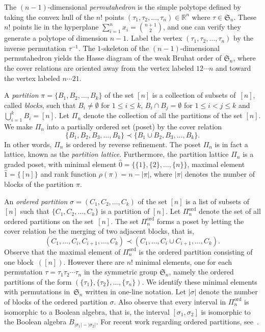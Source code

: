 \documentclass[ALCO,ThmDefs,Unicode,epreuves]{cedram}
\newcommand{\Rrr}{\mathbb{R}}
\newcommand{\Sym}{\mathfrak{S}}
\DeclareMathOperator{\ord}{ord}
\newcommand{\hz}{\hat{0}}
\newcommand{\ho}{\hat{1}}
\newcommand{\coveredby}{\prec}
\newcommand{\Qn}{\Pi^{\ord}_{n}}
\begin{document}
The $(n-1)$-dimensional
\emph{permutahedron} 
is the simple polytope defined by
taking the convex hull of the $n!$ points 
$(\tau_{1}, \tau_{2}, \ldots, \tau_{n}) \in \Rrr^{n}$
where $\tau \in \Sym_{n}$.
These $n!$ points lie in the hyperplane
$\sum_{i=1}^{n} x_{i} = \binom{n+1}{2}$,
and one can verify
they generate a
polytope of dimension $n-1$.
Label the vertex
$(\tau_{1}, \tau_{2}, \ldots, \tau_{n})$ by the inverse permutation $\tau^{-1}$.
The $1$-skeleton of the $(n-1)$-dimensional permutahedron
yields the Hasse diagram of the weak Bruhat order of $\Sym_{n}$,
where the cover relations are oriented away from
the vertex labeled $12 \cdots n$ and toward the vertex labeled $n \cdots 21$.




A \emph{partition} $\pi = \{B_{1}, B_{2}, \ldots, B_{k}\}$
of the set $[n]$ is a collection of subsets of~$[n]$, called \emph{blocks},
such that $B_{i} \neq \emptyset$ for $1 \leq i \leq k$,
$B_{i} \cap B_{j} = \emptyset$ for $1 \leq i < j \leq k$
and
$\bigcup_{i=1}^{k} B_{i} = [n]$.
Let $\Pi_{n}$ denote
the collection of all the partitions of the set $[n]$.
We make $\Pi_{n}$ into a partially ordered set (poset)
by the cover relation
$$
  \{B_{1}, B_{2}, B_{3}, \ldots, B_{k}\}
  \coveredby
  \{B_{1} \cup B_{2}, B_{3}, \ldots, B_{k}\} .
$$
In other words, $\Pi_{n}$ is ordered by reverse refinement.
The poset $\Pi_{n}$ is in fact a lattice,
known as the \emph{partition lattice}.
Furthermore, the partition lattice $\Pi_{n}$ is a graded poset,
with minimal element
$\hz = \{\{1\}, \{2\}, \ldots, \{n\}\}$,
maximal element
$\ho = \{[n]\}$
and rank function
$\rho(\pi) = n-|\pi|$,
where
$|\pi|$ denotes the number of blocks of the partition $\pi$.



An \emph{ordered partition} 
$\sigma = (C_{1}, C_{2}, \ldots, C_{k})$
of the set $[n]$
is a list of subsets of $[n]$ such that
$\{C_{1}, C_{2}, \ldots, C_{k}\}$
is a partition of $[n]$.
Let $\Qn$ denote the set of all
ordered partitions on the set~$[n]$.
The set $\Qn$ forms a poset
by letting the cover relation
be the merging of two adjacent blocks, that is,
$$
(C_{1}, \ldots, C_{i}, C_{i+1}, \ldots, C_{k})
\coveredby
(C_{1}, \ldots, C_{i} \cup C_{i+1}, \ldots, C_{k}) .
$$
Observe that the maximal element of
$\Qn$ is
the ordered partition consisting of one block~$([n])$.
However there are $n!$ minimal elements,
one for each permutation $\tau = \tau_{1} \tau_{2} \cdots \tau_{n}$
in the symmetric group $\Sym_{n}$, namely
the ordered partitions of the form
$(\{\tau_{1}\}, \{\tau_{2}\}, \ldots, \{\tau_{n}\})$.
We identify these minimal elements with
permutations in~$\Sym_{n}$ written in one-line notation.
Let $|\sigma|$ denote the number of blocks of the ordered partition $\sigma$.
Also observe that every interval in $\Qn$ is isomorphic
to a Boolean algebra,
that is,
the interval $[\sigma_{1},\sigma_{2}]$
is isomorphic to the Boolean algebra $B_{|\sigma_{1}| - |\sigma_{2}|}$.
For recent work regarding ordered partitions, 
see~\cite{Ehrenborg_Hedmark,Ehrenborg_Jung}.
\end{document}
